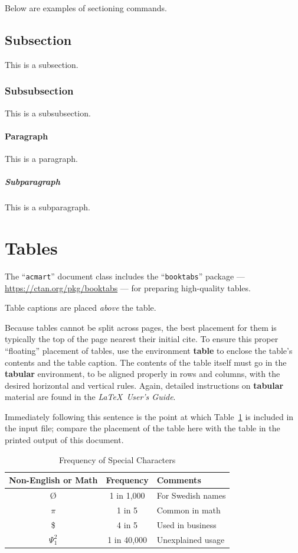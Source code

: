 \documentclass[manuscript,screen,review]{acmart}
\begin{document}
Below are examples of sectioning commands.

\subsection{Subsection}
\label{sec:subsection}

This is a subsection.

\subsubsection{Subsubsection}
\label{sec:subsubsection}

This is a subsubsection.

\paragraph{Paragraph}

This is a paragraph.

\subparagraph{Subparagraph}

This is a subparagraph.

\section{Tables}

The ``\verb|acmart|'' document class includes the ``\verb|booktabs|''
package --- \url{https://ctan.org/pkg/booktabs} --- for preparing
high-quality tables.

Table captions are placed {\itshape above} the table.

Because tables cannot be split across pages, the best placement for
them is typically the top of the page nearest their initial cite.  To
ensure this proper ``floating'' placement of tables, use the
environment \textbf{table} to enclose the table's contents and the
table caption.  The contents of the table itself must go in the
\textbf{tabular} environment, to be aligned properly in rows and
columns, with the desired horizontal and vertical rules.  Again,
detailed instructions on \textbf{tabular} material are found in the
\textit{\LaTeX\ User's Guide}.

Immediately following this sentence is the point at which
Table~\ref{tab:freq} is included in the input file; compare the
placement of the table here with the table in the printed output of
this document.

\begin{table}
  \caption{Frequency of Special Characters}
  \label{tab:freq}
  \begin{tabular}{ccl}
    \toprule
    Non-English or Math&Frequency&Comments\\
    \midrule
    \O & 1 in 1,000& For Swedish names\\
    $\pi$ & 1 in 5& Common in math\\
    \$ & 4 in 5 & Used in business\\
    $\Psi^2_1$ & 1 in 40,000& Unexplained usage\\
  \bottomrule
\end{tabular}
\end{table}
\end{document}
